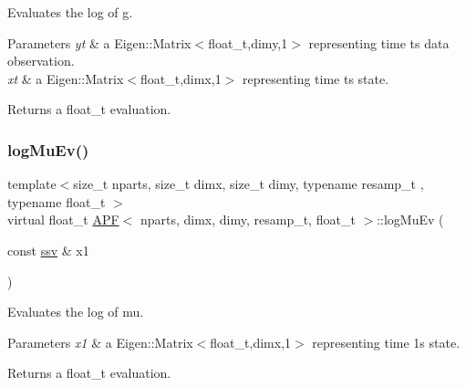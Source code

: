 Evaluates the log of g. 


\begin{DoxyParams}{Parameters}
{\em yt} & a Eigen\+::\+Matrix$<$float\+\_\+t,dimy,1$>$ representing time t\textquotesingle{}s data observation. \\
\hline
{\em xt} & a Eigen\+::\+Matrix$<$float\+\_\+t,dimx,1$>$ representing time t\textquotesingle{}s state. \\
\hline
\end{DoxyParams}
\begin{DoxyReturn}{Returns}
a float\+\_\+t evaluation. 
\end{DoxyReturn}
\mbox{\label{classAPF_a7f595770b8f17cbad8e00b98e1b3bd04}} 
\subsubsection{\texorpdfstring{log\+Mu\+Ev()}{logMuEv()}}
{\footnotesize\ttfamily template$<$size\+\_\+t nparts, size\+\_\+t dimx, size\+\_\+t dimy, typename resamp\+\_\+t , typename float\+\_\+t $>$ \\
virtual float\+\_\+t \hyperlink{classAPF}{A\+PF}$<$ nparts, dimx, dimy, resamp\+\_\+t, float\+\_\+t $>$\+::log\+Mu\+Ev (\begin{DoxyParamCaption}\item[{const \hyperlink{classAPF_a5f96da87f00ff75af1232f9021daf06a}{ssv} \&}]{x1 }\end{DoxyParamCaption})\hspace{0.3cm}{\ttfamily [pure virtual]}}



Evaluates the log of mu. 


\begin{DoxyParams}{Parameters}
{\em x1} & a Eigen\+::\+Matrix$<$float\+\_\+t,dimx,1$>$ representing time 1\textquotesingle{}s state. \\
\hline
\end{DoxyParams}
\begin{DoxyReturn}{Returns}
a float\+\_\+t evaluation. 
\end{DoxyReturn}
\mbox{\label{classAPF_aa892fcb9a774cd2158d107cb64f4db49}} 
